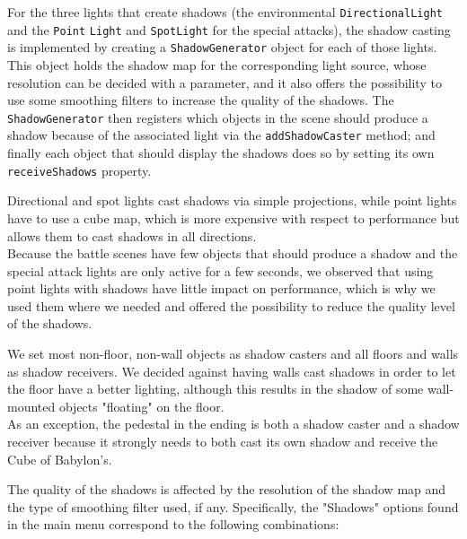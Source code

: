 For the three lights that create shadows (the environmental \texttt{DirectionalLight} and the \texttt{Point} \texttt{Light} and \texttt{SpotLight} for the special attacks), the shadow casting is implemented by creating a \texttt{ShadowGenerator} object for each of those lights. This object holds the shadow map for the corresponding light source, whose resolution can be decided with a parameter, and it also offers the possibility to use some smoothing filters to increase the quality of the shadows. The \texttt{ShadowGenerator} then registers which objects in the scene should produce a shadow because of the associated light via the \texttt{addShadowCaster} method; and finally each object that should display the shadows does so by setting its own \texttt{receiveShadows} property.

Directional and spot lights cast shadows via simple projections, while point lights have to use a cube map, which is more expensive with respect to performance but allows them to cast shadows in all directions.\\
Because the battle scenes have few objects that should produce a shadow and the special attack lights are only active for a few seconds, we observed that using point lights with shadows have little impact on performance, which is why we used them where we needed and offered the possibility to reduce the quality level of the shadows.

We set most non-floor, non-wall objects as shadow casters and all floors and walls as shadow receivers. We decided against having walls cast shadows in order to let the floor have a better lighting, although this results in the shadow of some wall-mounted objects "floating" on the floor.\\
As an exception, the pedestal in the ending is both a shadow caster and a shadow receiver because it strongly needs to both cast its own shadow and receive the Cube of Babylon's.

The quality of the shadows is affected by the resolution of the shadow map and the type of smoothing filter used, if any. Specifically, the "Shadows" options found in the main menu correspond to the following combinations:

